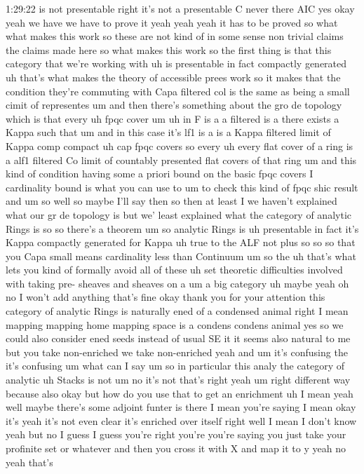 \begin{unfinished}{1:29:22}
is not presentable right it's not a
presentable C never there
AIC yes okay yeah we have we have to
prove it yeah yeah yeah it has to be
proved so what what makes this work so
these are not kind of in some sense non
trivial claims the claims made here so
what makes this
work so the first thing is that this
category that we're working with uh is
presentable in fact compactly
generated
uh that's what makes the theory of
accessible prees work so it makes that
the condition they're commuting with
Capa filtered col is the same as being a
small cimit of
representes um and then there's
something about the gro de topology
which is that
every uh fpqc
cover
um uh in
F is a a filtered is a there exists a
Kappa such that um and in this case it's
lf1 is a is a Kappa filtered
limit of Kappa comp
compact uh cap fpqc
covers so every uh every flat cover of a
ring is a alf1 filtered Co limit of
countably presented flat covers of that
ring um and this kind of condition
having some a priori bound
on the basic fpqc covers I cardinality
bound is what you can use to um to check
this kind of fpqc shic result and um
so well so maybe I'll say then so
then at
least I we haven't explained what our gr
de topology is but we' least explained
what the category of analytic Rings is
so so there's a theorem um
so analytic
Rings is uh
presentable in fact it's Kappa compactly
generated for
Kappa uh true to the ALF not plus
so
so so that you Capa small means
cardinality less than Continuum um
so the uh that's what lets you kind of
formally avoid all of these uh set
theoretic difficulties involved with
taking pre- sheaves and sheaves on a um
a big
category uh maybe
yeah oh no I won't add anything that's
fine okay thank you for your attention
this category of analytic Rings is
naturally ened of a condensed animal
right I mean
mapping mapping home mapping space
is a condens condens animal yes so we
could also consider ened seeds
instead of usual SE it it seems also
natural to me but you take non-enriched
we take non-enriched yeah and
um it's confusing
the it's
confusing
um what can I
say
um
so in particular this analy the category
of analytic uh Stacks is
not um no it's not that's right
yeah um right different
way because also okay but how do you use
that to get an
enrichment uh
I
mean yeah well maybe there's some
adjoint funter is
there I mean you're saying I mean okay
it's yeah it's not even clear it's
enriched over itself
right
well I mean I don't know yeah but no I
guess I guess you're right you're you're
saying you just take your profinite set
or whatever and then you cross it with X
and map it to y yeah no yeah that's

\end{unfinished}

